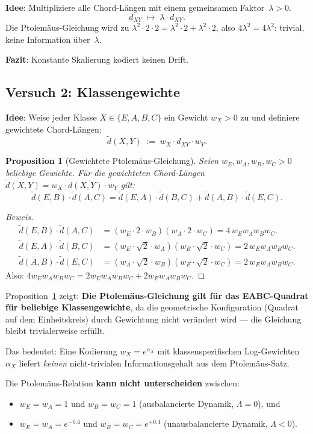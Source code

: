 \documentclass[12pt,a4paper]{article}
\newtheorem{proposition}[definition]{Proposition}
\newenvironment{beweis}{\begin{proof}[Beweis]}{\end{proof}}
\newcommand{\chord}[2]{d_{#1#2}}   %
\begin{document}
\textbf{Idee}: Multipliziere alle Chord-Längen mit einem gemeinsamen Faktor~$\lambda > 0$.
\[
  \chord{X}{Y} \;\mapsto\; \lambda \cdot \chord{X}{Y}.
\]
Die Ptolemäus-Gleichung wird zu
$\lambda^2 \cdot 2 \cdot 2 = \lambda^2 \cdot 2 + \lambda^2 \cdot 2$, also
$4\lambda^2 = 4\lambda^2$: trivial, keine Information über~$\lambda$.

\textbf{Fazit}: Konstante Skalierung kodiert keinen Drift.

\subsection{Versuch 2: Klassengewichte}

\textbf{Idee}: Weise jeder Klasse $X \in \{E,A,B,C\}$ ein Gewicht $w_X > 0$ zu
und definiere gewichtete Chord-Längen:
\[
  \tilde{d}(X,Y) \;:=\; w_X \cdot \chord{X}{Y} \cdot w_Y.
\]

\begin{proposition}[Gewichtete Ptolemäus-Gleichung]
\label{prop:gewichtet}
Seien $w_E, w_A, w_B, w_C > 0$ beliebige Gewichte.
Für die gewichteten Chord-Längen $\tilde{d}(X,Y) = w_X \cdot d(X,Y) \cdot w_Y$
gilt:
\[
  \tilde{d}(E,B)\cdot\tilde{d}(A,C)
  = \tilde{d}(E,A)\cdot\tilde{d}(B,C) + \tilde{d}(A,B)\cdot\tilde{d}(E,C).
\]
\end{proposition}

\begin{beweis}
\begin{align*}
  \tilde{d}(E,B)\cdot\tilde{d}(A,C)
  &= (w_E \cdot 2 \cdot w_B)(w_A \cdot 2 \cdot w_C)
   = 4\,w_E w_A w_B w_C. \\
  \tilde{d}(E,A)\cdot\tilde{d}(B,C)
  &= (w_E \cdot \sqrt{2} \cdot w_A)(w_B \cdot \sqrt{2} \cdot w_C)
   = 2\,w_E w_A w_B w_C. \\
  \tilde{d}(A,B)\cdot\tilde{d}(E,C)
  &= (w_A \cdot \sqrt{2} \cdot w_B)(w_E \cdot \sqrt{2} \cdot w_C)
   = 2\,w_E w_A w_B w_C.
\end{align*}
Also: $4 w_E w_A w_B w_C = 2 w_E w_A w_B w_C + 2 w_E w_A w_B w_C$. \qedhere
\end{beweis}

\begin{tcolorbox}[warnung, title={Strukturelles Problem}]
Proposition~\ref{prop:gewichtet} zeigt: \textbf{Die Ptolemäus-Gleichung gilt
für das EABC-Quadrat für beliebige Klassengewichte}, da die geometrische
Konfiguration (Quadrat auf dem Einheitskreis) durch Gewichtung nicht
verändert wird --- die Gleichung bleibt trivialerweise erfüllt.

Das bedeutet: Eine Kodierung $w_X = e^{\alpha_X}$ mit klassenspezifischen
Log-Gewichten~$\alpha_X$ liefert \emph{keinen} nicht-trivialen Informationsgehalt
aus dem Ptolemäus-Satz.

Die Ptolemäus-Relation \textbf{kann nicht unterscheiden} zwischen:
\begin{itemize}[leftmargin=*]
  \item $w_E = w_A = 1$ und $w_B = w_C = 1$ (ausbalancierte Dynamik, $\Lambda = 0$), und
  \item $w_E = w_A = e^{-0.4}$ und $w_B = w_C = e^{+0.4}$ (unausbalancierte Dynamik, $\Lambda < 0$).
\end{itemize}
\end{tcolorbox}
\end{document}
